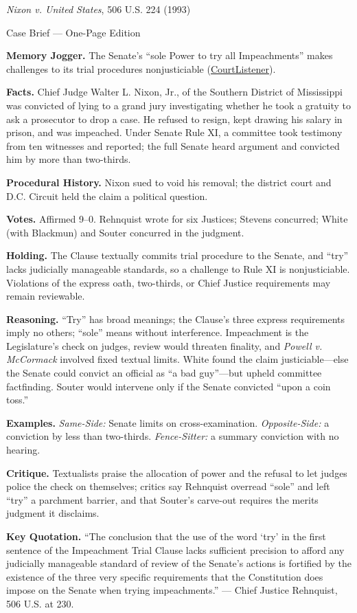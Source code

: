 \documentclass[12pt]{article}
\begin{document}
\begin{center}
{\Large \textit{Nixon v. United States}, 506 U.S. 224 (1993)\par}
\vspace{0.3em}
{\normalsize Case Brief --- One-Page Edition\par}
\end{center}

\textbf{Memory Jogger.} The Senate's ``sole Power to try all Impeachments'' makes challenges to its trial procedures nonjusticiable (\href{https://www.courtlistener.com/opinion/112803/nixon-v-united-states/}{CourtListener}).

\textbf{Facts.} Chief Judge Walter L. Nixon, Jr., of the Southern District of Mississippi was convicted of lying to a grand jury investigating whether he took a gratuity to ask a prosecutor to drop a case. He refused to resign, kept drawing his salary in prison, and was impeached. Under Senate Rule XI, a committee took testimony from ten witnesses and reported; the full Senate heard argument and convicted him by more than two-thirds.

\textbf{Procedural History.} Nixon sued to void his removal; the district court and D.C. Circuit held the claim a political question.

\textbf{Votes.} Affirmed 9--0. Rehnquist wrote for six Justices; Stevens concurred; White (with Blackmun) and Souter concurred in the judgment.

\textbf{Holding.} The Clause textually commits trial procedure to the Senate, and ``try'' lacks judicially manageable standards, so a challenge to Rule XI is nonjusticiable. Violations of the express oath, two-thirds, or Chief Justice requirements may remain reviewable.

\textbf{Reasoning.} ``Try'' has broad meanings; the Clause's three express requirements imply no others; ``sole'' means without interference. Impeachment is the Legislature's check on judges, review would threaten finality, and \textit{Powell v. McCormack} involved fixed textual limits. White found the claim justiciable---else the Senate could convict an official as ``a bad guy''---but upheld committee factfinding. Souter would intervene only if the Senate convicted ``upon a coin toss.''

\textbf{Examples.} \emph{Same-Side:} Senate limits on cross-examination. \emph{Opposite-Side:} a conviction by less than two-thirds. \emph{Fence-Sitter:} a summary conviction with no hearing.

\textbf{Critique.} Textualists praise the allocation of power and the refusal to let judges police the check on themselves; critics say Rehnquist overread ``sole'' and left ``try'' a parchment barrier, and that Souter's carve-out requires the merits judgment it disclaims.

\textbf{Key Quotation.} ``The conclusion that the use of the word `try' in the first sentence of the Impeachment Trial Clause lacks sufficient precision to afford any judicially manageable standard of review of the Senate's actions is fortified by the existence of the three very specific requirements that the Constitution does impose on the Senate when trying impeachments.'' --- Chief Justice Rehnquist, 506 U.S. at 230.
\end{document}
